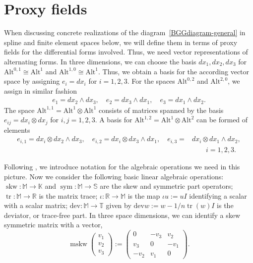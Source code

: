 \documentclass[final]{amsart}%
\newcommand{\0}{\mathaccent23}
\newcommand\tr{\operatorname{tr}}
\newcommand\skw{\operatorname{skw}}
\newcommand\mskw{\operatorname{mskw}}
\newcommand\sym{\operatorname{sym}}
\newcommand\dev{\mathrm{dev}}
\newcommand \alt{\mathrm{Alt}}
\newcommand\K{\mathbb{K}}
\newcommand\M{\mathbb{M}}
\renewcommand\S{{\mathbb S}}
\newcommand\R{\mathbb{R}}
\begin{document}
\section{Proxy fields}
\label{sec:appendix-proxies}
When discussing concrete realizations of the diagram~\eqref{BGGdiagram-general} in spline and finite element spaces below, we will define them in terms of proxy fields for the differential forms involved. Thus, we need vector representations of alternating forms. In three dimensions, we can choose the basis $dx_1, dx_2, dx_3$ for $\alt^{0,1} \cong \alt^1$
and $\alt^{1,0} \cong \alt^1$. Thus, we obtain a basis for the according vector space by assigning $e_i=dx_i$ for $i=1,2,3$. For the spaces $\alt^{0,2}$ and $\alt^{2,0}$, we assign in similar fashion
\begin{gather}
    e_1 = dx_2\wedge dx_3,
    \quad e_2 = dx_3\wedge dx_1,
    \quad e_3 = dx_1\wedge dx_2.
\end{gather}
The space $\alt^{1,1} = \alt^1\otimes \alt^1$ consists of matrices spanned by the basis $e_{ij} = dx_i\otimes dx_j$ for $i,j=1,2,3$. A basis for $\alt^{1,2} = \alt^1\otimes \alt^2$ can be formed of elements
\begin{align}
  \label{tensorform-1-2}
    e_{i,1} = dx_i\otimes dx_2\wedge dx_3,
    \quad e_{i,2} = dx_i\otimes dx_3\wedge dx_1,
    \quad e_{i,3} =& dx_i\otimes dx_1\wedge dx_2,
 \\\nonumber &   \qquad i=1,2,3.
\end{align}

Following \cite{arnold2021complexes}, we introduce notation for the algebraic operations we need in this picture.  Now we consider the following  basic linear algebraic operations:    $\skw: \M\to \K$ and $\sym:\M\to\S$ are the skew and symmetric part operators; $\tr:\M\to\R$ is the matrix trace; $\iota: \R\to \M$ is the map $\iota u:= uI$ identifying a scalar with a scalar matrix; $\dev:\mathbb{M}\to \mathbb{T}$ given by $\dev w:=w-1/n \tr (w)I$ is the deviator, or trace-free part.
In three space dimensions, we can identify a skew symmetric matrix with a vector,
$$
 \mskw\left ( 
\begin{array}{c}
v_{1}\\ v_{2}\\ v_{3}
\end{array}
\right ):= \left ( 
\begin{array}{ccc}
0 & -v_{3} & v_{2} \\
v_{3} & 0 & -v_{1}\\
-v_{2} & v_{1} & 0
\end{array}
\right ).
$$
\end{document}
